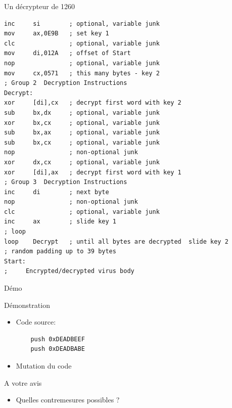 \documentclass{beamer}
\begin{document}
\begin{frame}[fragile]
\begin{exampleblock}{Un décrypteur de 1260}
\begin{lstlisting}[basicstyle=\tiny]
inc     si        ; optional, variable junk
mov     ax,0E9B   ; set key 1
clc               ; optional, variable junk
mov     di,012A   ; offset of Start
nop               ; optional, variable junk
mov     cx,0571   ; this many bytes - key 2
; Group 2  Decryption Instructions
Decrypt:
xor     [di],cx   ; decrypt first word with key 2
sub     bx,dx     ; optional, variable junk
xor     bx,cx     ; optional, variable junk
sub     bx,ax     ; optional, variable junk
sub     bx,cx     ; optional, variable junk
nop               ; non-optional junk
xor     dx,cx     ; optional, variable junk
xor     [di],ax   ; decrypt first word with key 1
; Group 3  Decryption Instructions
inc     di        ; next byte
nop               ; non-optional junk
clc               ; optional, variable junk
inc     ax        ; slide key 1
; loop
loop    Decrypt   ; until all bytes are decrypted  slide key 2
; random padding up to 39 bytes
Start:
;     Encrypted/decrypted virus body
\end{lstlisting} 
\end{exampleblock}
\end{frame}

\begin{frame}[fragile]{Démo}
\begin{alertblock}{Démonstration}
\begin{itemize}
\item Code source: 
 \begin{lstlisting}
	push 0xDEADBEEF
	push 0xDEADBABE
\end{lstlisting}
\item Mutation du code
\end{itemize}
\end{alertblock}
\end{frame}

\begin{frame}{A votre avis}
\begin{itemize}
\item \huge{Quelles contremesures possibles ?}
\end{itemize}
\end{frame}
\end{document}
